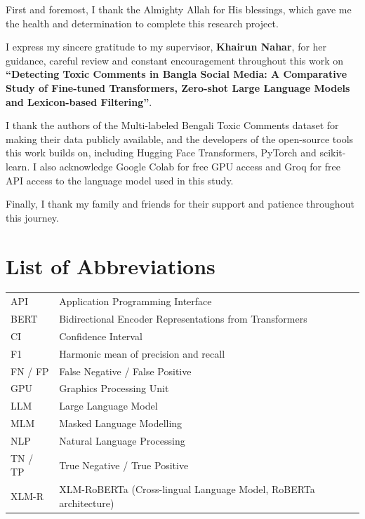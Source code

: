 \documentclass[12pt]{report}
\newcommand{\thesistitle}{Detecting Toxic Comments in Bangla Social Media: A Comparative Study of Fine-tuned Transformers, Zero-shot Large Language Models and Lexicon-based Filtering}
\newcommand{\supervisor}{Khairun Nahar}
\begin{document}
First and foremost, I thank the Almighty Allah for His blessings, which gave me the health and determination to complete this research project.

I express my sincere gratitude to my supervisor, \textbf{\supervisor}, for her guidance, careful review and constant encouragement throughout this work on \textbf{``\thesistitle''}.

I thank the authors of the Multi-labeled Bengali Toxic Comments dataset for making their data publicly available, and the developers of the open-source tools this work builds on, including Hugging Face Transformers, PyTorch and scikit-learn. I also acknowledge Google Colab for free GPU access and Groq for free API access to the language model used in this study.


Finally, I thank my family and friends for their support and patience throughout this journey.

\newpage
\renewcommand*\contentsname{Table of Contents}
\setcounter{tocdepth}{1}
\tableofcontents
\clearpage
\listoffigures
\clearpage
\listoftables
\clearpage

\chapter*{List of Abbreviations}
\begin{tabular}{@{}ll@{}}
API     & Application Programming Interface \\
BERT    & Bidirectional Encoder Representations from Transformers \\
CI      & Confidence Interval \\
F1      & Harmonic mean of precision and recall \\
FN / FP & False Negative / False Positive \\
GPU     & Graphics Processing Unit \\
LLM     & Large Language Model \\
MLM     & Masked Language Modelling \\
NLP     & Natural Language Processing \\
TN / TP & True Negative / True Positive \\
XLM-R   & XLM-RoBERTa (Cross-lingual Language Model, RoBERTa architecture) \\
\end{tabular}
\end{document}
